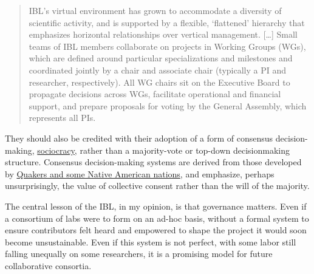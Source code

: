 \documentclass[10pt]{article}
\begin{document}
\begin{multicols}{2}
\begin{quote}
IBL's virtual environment has grown to accommodate a diversity of
scientific activity, and is supported by a flexible, `flattened'
hierarchy that emphasizes horizontal relationships over vertical
management. {[}\ldots{]} Small teams of IBL members collaborate on
projects in Working Groups (WGs), which are defined around particular
specializations and milestones and coordinated jointly by a chair and
associate chair (typically a PI and researcher, respectively). All WG
chairs sit on the Executive Board to propagate decisions across WGs,
facilitate operational and financial support, and prepare proposals for
voting by the General Assembly, which represents all PIs. \cite{woolKnowledgeNetworksHow2020} 
\end{quote}

They should also be credited with their adoption of a form of consensus
decision-making, \href{https://sociocracy.info}{sociocracy}, rather than
a majority-vote or top-down decisionmaking structure. Consensus
decision-making systems are derived from those developed by
\href{https://rhizomenetwork.wordpress.com/2011/06/18/a-brief-history-of-consenus-decision-making/}{Quakers
and some Native American nations}, and emphasize, perhaps
unsurprisingly, the value of collective consent rather than the will of
the majority.

The central lesson of the IBL, in my opinion, is that governance
matters. Even if a consortium of labs were to form on an ad-hoc basis,
without a formal system to ensure contributors felt heard and empowered
to shape the project it would soon become unsustainable. Even if this
system is not perfect, with some labor still falling unequally on some
researchers, it is a promising model for future collaborative consortia.


\end{multicols}
\end{document}
